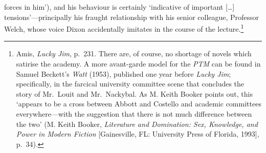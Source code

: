 \documentclass[]{article}
\begin{document}
forces in him’), and his behaviour is certainly ‘indicative of important
{[}\ldots{}{]} tensions’—principally his fraught relationship with his
senior colleague, Professor Welch, whose voice Dixon accidentally
imitates in the course of the lecture.\footnote{Amis, \emph{Lucky Jim},
  p.~231. There are, of course, no shortage of novels which satirise the
  academy. A more avant-garde model for the \emph{PTM} can be found in
  Samuel Beckett’s \emph{Watt} (1953), published one year before
  \emph{Lucky Jim}; specifically, in the farcical university committee
  scene that concludes the story of Mr.~Louit and Mr.~Nackybal. As M.
  Keith Booker points out, this ‘appears to be a cross between Abbott
  and Costello and academic committees everywhere—with the suggestion
  that there is not much difference between the two’ (M. Keith Booker,
  \emph{Literature and Domination: Sex, Knowledge, and Power in Modern
  Fiction} {[}Gainesville, FL: University Press of Florida, 1993{]},
  p.~34).}
\end{document}
